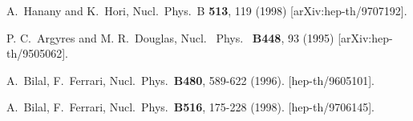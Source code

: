 \documentclass[epsfig,12pt]{article}
\begin{document}
\begin{thebibliography}{99}
A.~Hanany and K.~Hori,
  Nucl.\ Phys.\  B {\bf 513}, 119 (1998)
  [arXiv:hep-th/9707192].

P. C.~Argyres and M. R.~Douglas,
Nucl. \ Phys. \ {\bf B448}, 93 (1995)   
[arXiv:hep-th/9505062].
  
  A.~Bilal, F.~Ferrari,
  Nucl.\ Phys.\  {\bf B480}, 589-622 (1996).
  [hep-th/9605101].

  A.~Bilal, F.~Ferrari,
  Nucl.\ Phys.\  {\bf B516}, 175-228 (1998).
  [hep-th/9706145].

\end{thebibliography}
\end{document}
